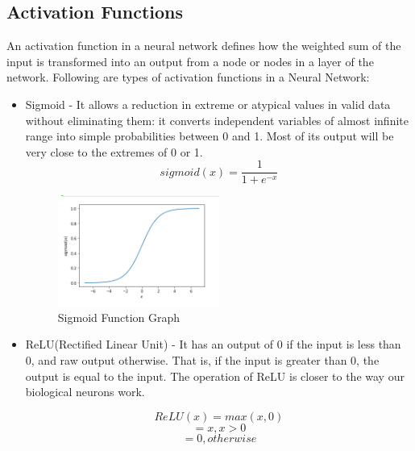 \subsection{Activation Functions}
An activation function in a neural network defines how the weighted sum of the input is transformed into an output from a node or nodes in a layer of the network. Following are types of activation functions in a Neural Network:
\begin{itemize}
    \item Sigmoid - It allows a reduction in extreme or atypical values in valid data without eliminating them: it converts independent variables of almost infinite range into simple probabilities between 0 and 1. Most of its output will be very close to the extremes of 0 or 1.
    \begin{equation}
        sigmoid(x)=\frac{1}{1+e^{-x}}     \end{equation}
    \begin{figure}[h!]
        \centering
        \includegraphics[width=0.5\textwidth]{img/sigmoid.png}
        \caption{Sigmoid Function Graph}
        \label{fig:sigmoid-graphl}
    \end{figure}
    \item ReLU(Rectified Linear Unit) - It has an output of 0 if the input is less than 0, and raw output otherwise. That is, if the input is greater than 0, the output is equal to the input. The operation of ReLU is closer to the way our biological neurons work. 
        
        $$ReLU(x)=max(x,0)$$
        $$=x,x>0$$
        $$=0,otherwise$$
     

\end{itemize}
